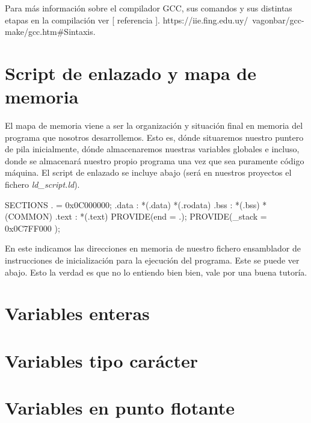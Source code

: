 \documentclass[12pt]{article}
\begin{document}
Para más información sobre el compilador GCC, sus comandos y sus distintas 
etapas en la compilación ver [ referencia ].
https://iie.fing.edu.uy/~vagonbar/gcc-make/gcc.htm\#Sintaxis.


\section{Script de enlazado y mapa de memoria}

El mapa de memoria viene a ser la organización y situación final en memoria del 
programa que nosotros desarrollemos. Esto es, dónde situaremos nuestro puntero
de pila inicialmente, dónde almacenaremos nuestras variables globales e incluso,
donde se almacenará nuestro propio programa una vez que sea puramente código
máquina. El script de enlazado se incluye abajo (será en nuestros proyectos el
fichero \textit{ld\_script.ld}).

\begin{listing}
SECTIONS {
    . = 0x0C000000;
    .data : {
      *(.data)
      *(.rodata)
}
.bss : {
*(.bss)
*(COMMON) }
.text : {
*(.text) }
    PROVIDE(end = .);
    PROVIDE(_stack = 0x0C7FF000 );
}
\end{listing}

En este indicamos las direcciones en memoria de nuestro fichero ensamblador de 
instrucciones de inicialización para la ejecución del programa. Este se puede ver
abajo. Esto la verdad es que no lo entiendo bien bien, vale por una buena tutoría.


\section{Variables enteras}

\section{Variables tipo carácter}

\section{Variables en punto flotante}
\end{document}
